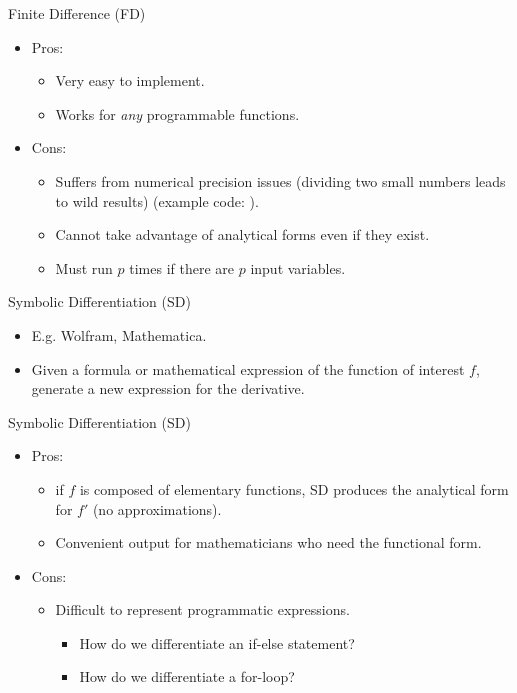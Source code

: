 \begin{frame}{Finite Difference (FD)}
\begin{itemize}
    \item Pros:
    \begin{itemize}
        \item Very easy to implement.
        \item Works for \emph{any} programmable functions.
    \end{itemize}
    \item Cons:
    \begin{itemize}
        \item Suffers from numerical precision issues (dividing two small numbers leads to wild results) 
            (example code: \href{https://github.com/JamesYang007/FastAD-Report/blob/master/slides/stanford-01272022/examples/src/fd_prec.cpp}{}).
        \item Cannot take advantage of analytical forms even if they exist.
        \item Must run $p$ times if there are $p$ input variables.
    \end{itemize}
\end{itemize}
\end{frame}

\begin{frame}{Symbolic Differentiation (SD)}
\begin{itemize}
    \item E.g. Wolfram, Mathematica.
    \item Given a formula or mathematical expression of the function of interest $f$,
    generate a new expression for the derivative.
\end{itemize}
\end{frame}

\begin{frame}{Symbolic Differentiation (SD)}
\begin{itemize}
    \item Pros:
    \begin{itemize}
        \item if $f$ is composed of elementary functions,
            SD produces the analytical form for $f'$ (no approximations).
        \item Convenient output for mathematicians who need the functional form.
    \end{itemize}
    \item Cons:
    \begin{itemize}
        \item Difficult to represent programmatic expressions.
        \begin{itemize}
            \item How do we differentiate an if-else statement?
            \item How do we differentiate a for-loop?
        \end{itemize}
    \end{itemize}
\end{itemize}
\end{frame}

